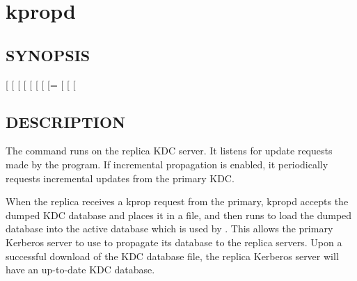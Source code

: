\documentclass[letterpaper,10pt,english]{sphinxmanual}
\begin{document}
\section{kpropd}
\label{\detokenize{admin/admin_commands/kpropd::doc}}\label{\detokenize{admin/admin_commands/kpropd:kpropd}}\label{\detokenize{admin/admin_commands/kpropd:kpropd-8}}

\subsection{SYNOPSIS}
\label{\detokenize{admin/admin_commands/kpropd:synopsis}}
{[} \sphinxstyleemphasis{realm}{]}
{[} \sphinxstyleemphasis{admin\_server}{]}
{[} \sphinxstyleemphasis{acl\_file}{]}
{[} \sphinxstyleemphasis{replica\_dumpfile}{]}
{[} \sphinxstyleemphasis{principal\_database}{]}
{[} \sphinxstyleemphasis{kdb5\_util\_prog}{]}
{[} \sphinxstyleemphasis{port}{]}
{[}=\sphinxstyleemphasis{pid\_file}{]}
{[}\sphinxstylestrong{-D}{]}
{[}\sphinxstylestrong{-d}{]}
{[} \sphinxstyleemphasis{keytab\_file}{]}


\subsection{DESCRIPTION}
\label{\detokenize{admin/admin_commands/kpropd:description}}
The  command runs on the replica KDC server.  It listens for
update requests made by the {\hyperref[\detokenize{admin/admin_commands/kprop:kprop-8}]{}} program.  If incremental
propagation is enabled, it periodically requests incremental updates
from the primary KDC.

When the replica receives a kprop request from the primary, kpropd
accepts the dumped KDC database and places it in a file, and then runs
{\hyperref[\detokenize{admin/admin_commands/kdb5_util:kdb5-util-8}]{}} to load the dumped database into the active
database which is used by {\hyperref[\detokenize{admin/admin_commands/krb5kdc:krb5kdc-8}]{}}.  This allows the primary
Kerberos server to use {\hyperref[\detokenize{admin/admin_commands/kprop:kprop-8}]{}} to propagate its database to
the replica servers.  Upon a successful download of the KDC database
file, the replica Kerberos server will have an up-to-date KDC
database.
\end{document}
